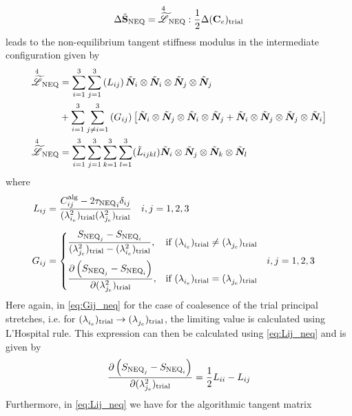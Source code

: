 \begin{equation}
    \Delta \tilde{\mathbf{S}}_{\text{NEQ}} = {\overset{4}{\widetilde{\mathscr{L}}}}_{\text{NEQ}} : \frac{1}{2} \Delta ({\mathbf{C}_{e}})_\text{trial}
\end{equation}
leads to the non-equilibrium tangent stiffness modulus in the intermediate configuration given by
\begin{align}
  \nonumber  {\overset{4}{\widetilde{\mathscr{L}}}}_{\text{NEQ}} 
&= \sum_{i=1}^{3} \sum_{j=1}^{3} \left( L_{ij} \right) \tilde{\bm{N}}_{i}\otimes \tilde{\bm{N}}_{i} \otimes \tilde{\bm{N}}_{j} \otimes \tilde{\bm{N}}_{j} \\
&+\sum_{i=1}^{3} \sum_{j\neq i=1}^{3} \left(G_{ij} \right) \left[\tilde{\bm{N}}_{i}\otimes \tilde{\bm{N}}_{j} \otimes \tilde{\bm{N}}_{i} \otimes \tilde{\bm{N}}_{j} + \tilde{\bm{N}}_{i}\otimes \tilde{\bm{N}}_{j} \otimes \tilde{\bm{N}}_{j} \otimes \tilde{\bm{N}}_{i} \right]\\
{\overset{4}{\widetilde{\mathscr{L}}}}_{\text{NEQ}}&= \sum_{i=1}^{3}\sum_{j=1}^{3}\sum_{k=1}^{3}\sum_{l=1}^{3} (\tilde{L}_{ijkl}) \tilde{\bm{N}}_{i} \otimes \tilde{\bm{N}}_{j}  \otimes \tilde{\bm{N}}_{k}\otimes \tilde{\bm{N}}_{l}
\label{eq:Lneq_til}
\end{align}
where 
\begin{align}
    L_{ij} 
    &= \frac{C^{\text{alg}}_{ij} - 2 {{\tau}_{\text{NEQ}}}_{i} \delta_{ij}}{({\lambda^{2}_{{i}_e}})_\text{trial}({\lambda^{2}_{{j}_e}})_\text{trial}} \quad i,j=1,2,3 \label{eq:Lij_neq}\\[0.5em]
    G_{ij} 
    &= \begin{cases}
        \begin{aligned}
            &\frac{{S}_{\text{NEQ}_{j}}- {S}_{\text{NEQ}_{i}}}{({\lambda^{2}_{{j}_e}})_\text{trial} - ({\lambda^{2}_{{i}_e}})_\text{trial}},  && \text{if } ({\lambda^{}_{{i}_e}})_\text{trial} \neq ({\lambda^{}_{{j}_e}})_\text{trial} \\[0.5em]
            &\pdv{\left({S}_{\text{NEQ}_{j}}- {S}_{\text{NEQ}_{i}}\right)}{({\lambda^{2}_{{j}_e}})_\text{trial}}, && \text{if } ({\lambda^{}_{{i}_e}})_\text{trial} = ({\lambda^{}_{{j}_e}})_\text{trial} 
        \end{aligned}
        \quad i,j=1,2,3
    \end{cases}
    \label{eq:Gij_neq}
\end{align}
Here again, in \cref{eq:Gij_neq} for the case of coalesence of the trial principal stretches, i.e. for \(({\lambda^{}_{{i}_e}})_\text{trial} \to ({\lambda^{}_{{j}_e}})_\text{trial}\), the limiting value is calculated using L'Hospital rule. This expression can then be calculated using \cref{eq:Lij_neq} \cite[cf.][Eq 3.263]{Wriggers} and is given by 
\begin{equation}
\pdv{\left({S}_{\text{NEQ}_{j}}- {S}_{\text{NEQ}_{i}}\right)}{({\lambda^{2}_{{j}_e}})_\text{trial}} = \dfrac{1}{2} L_{ii} - L_{ij}
\end{equation}
Furthermore, in \cref{eq:Lij_neq} we have for the algorithmic tangent matrix 
